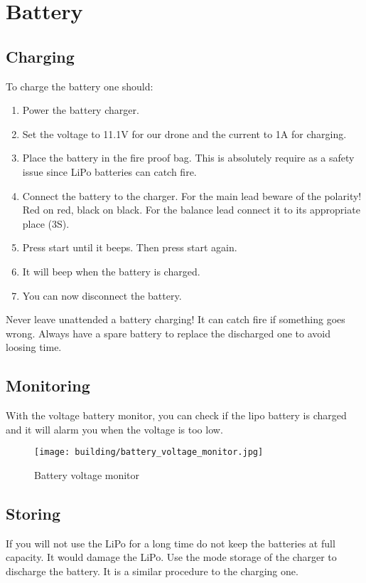 \section{Battery}
\subsection{Charging}
To charge the battery one should:
\begin{enumerate}
    \item Power the battery charger.
    \item Set the voltage to 11.1V for our drone and the current to 1A for charging.
    \item Place the battery in the fire proof bag. This is absolutely require as a safety issue since LiPo batteries can catch fire.
    \item Connect the battery to the charger. For the main lead beware of the polarity! Red on red, black on black. For the balance lead connect it to its appropriate place (3S).
    \item Press start until it beeps. Then press start again.
    \item It will beep when the battery is charged.
    \item You can now disconnect the battery.
\end{enumerate}
Never leave unattended a battery charging! It can catch fire if something goes wrong.
Always have a spare battery to replace the discharged one to avoid loosing time.

\subsection{Monitoring}
With the voltage battery monitor, you can check if the lipo battery is charged and it will alarm you when the voltage is too low.

\begin{figure}[!ht]
    \centering
    \texttt{[image: building/battery\_voltage\_monitor.jpg]}
    \caption{Battery voltage monitor}
    \label{fig:battery_monitor}
\end{figure}

\subsection{Storing}
If you will not use the LiPo for a long time do not keep the batteries at full capacity. It would damage the LiPo. Use the mode storage of the charger to discharge the battery. It is a similar procedure to the charging one.

